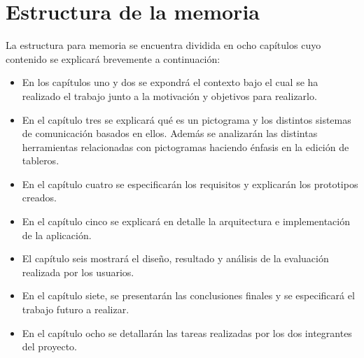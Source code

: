 \section{Estructura de la memoria}
\label{cap1:sec:Estructura}

La estructura para memoria se encuentra dividida en ocho capítulos cuyo contenido se explicará brevemente a continuación: 
\begin{itemize}
	\item En los capítulos uno y dos se expondrá el contexto bajo el cual se ha realizado el trabajo junto a la motivación y objetivos para realizarlo.
	
	\item En el capítulo tres se explicará qué es un pictograma y los distintos sistemas de comunicación basados en ellos. Además se analizarán las distintas herramientas relacionadas con pictogramas haciendo énfasis en la edición de tableros.
	
	\item En el capítulo cuatro se especificarán los requisitos y explicarán los prototipos creados.
	
	\item En el capítulo cinco se explicará en detalle la arquitectura e implementación de la aplicación.
	
	\item El capítulo seis mostrará el diseño, resultado y análisis de la evaluación realizada por los usuarios. 
	
	\item En el capítulo siete, se presentarán las conclusiones finales y se especificará el trabajo futuro a realizar.
	
	\item En el capítulo ocho se detallarán las tareas realizadas por los dos integrantes del proyecto.
\end{itemize}	




